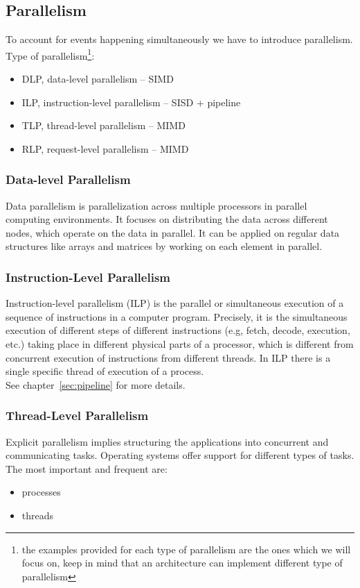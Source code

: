 \subsection{Parallelism}\label{subsec:parallelism}
To account for events happening simultaneously we have to introduce parallelism.
Type of parallelism\footnote{the examples provided for each type of parallelism are the ones which we will focus on,
    keep in mind that an architecture can implement different type of parallelism}:
\begin{itemize}
    \item DLP, data-level parallelism -- SIMD
    \item ILP, instruction-level parallelism -- SISD + pipeline
    \item TLP, thread-level parallelism -- MIMD
    \item RLP, request-level parallelism -- MIMD
\end{itemize}


\subsubsection{Data-level Parallelism}
Data parallelism is parallelization across multiple processors in parallel computing environments.
It focuses on distributing the data across different nodes, which operate on the data in parallel.
It can be applied on regular data structures like arrays and matrices by working on each element in parallel.

\subsubsection{Instruction-Level Parallelism}
Instruction-level parallelism (ILP) is the parallel or simultaneous execution of a sequence of instructions in a
computer program.
Precisely, it is the simultaneous execution of different steps of different instructions
(e.g, fetch, decode, execution, etc.) taking place in different physical parts of a processor, which is different
from concurrent execution of instructions from different threads.
In ILP there is a single specific thread of execution of a process.\\
See chapter~\ref{sec:pipeline} for more details.

\subsubsection{Thread-Level Parallelism}
Explicit parallelism implies structuring the applications into concurrent and communicating tasks.
Operating systems offer support for different types of tasks.
The most important and frequent are:
\begin{itemize}
    \item processes
    \item threads
\end{itemize}

